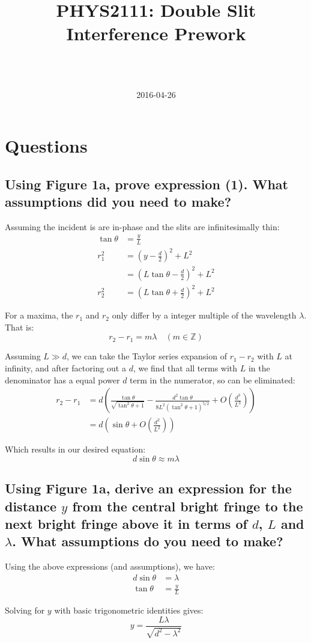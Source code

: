 \documentclass[a4paper]{scrartcl}
\begin{document}
\title{PHYS2111: Double Slit Interference Prework}
\author{ \\ \\ }
\date{2016-04-26}
\maketitle

\section{Questions}
\subsection{Using Figure 1a, prove expression (1). What assumptions did you need to make?}
Assuming the incident is are in-phase and the slits are infinitesimally thin:
\begin{align*}
    \tan \theta &= \frac{y}{L} \\
    r_1^2 &= (y - \frac{d}{2})^2 + L^2 \\
    &= (L \tan \theta - \frac{d}{2})^2 + L^2 \\
    r_2^2 &= (L \tan \theta + \frac{d}{2})^2 + L^2
\end{align*}

For a maxima, the \(r_1\) and \(r_2\) only differ by a integer multiple of the wavelength \(\lambda\). That is:
\[r_2 - r_1 = m \lambda \quad (m \in \mathbb{Z})\]

Assuming \(L \gg d\), we can take the Taylor series expansion of \(r_1 - r_2\) with \(L\) at infinity, and after factoring out a \(d\), we find that all terms with \(L\) in the denominator has a equal power \(d\) term in the numerator, so can be eliminated:
\begin{align*}
    r_2 - r_1 &= d \left(\frac{\tan \theta}{\sqrt{\tan^2 \theta + 1}} - \frac{d^2 \tan \theta}{8 L^2 \left(\tan^2 \theta + 1\right)^{5/2}} + O\left(\frac{d^3}{L^3}\right)\right) \\
    &= d \left(\sin \theta + O\left(\frac{d^2}{L^2}\right)\right)
\end{align*}

Which results in our desired equation:
\[d \sin \theta \approx m \lambda\]

\subsection{Using Figure 1a, derive an expression for the distance \(y\) from the central bright fringe to the next bright fringe above it in terms of \(d\), \(L\) and \(\lambda\). What assumptions do you need to make?}
Using the above expressions (and assumptions), we have:
\begin{align*}
    d \sin \theta &= \lambda \\
    \tan \theta &= \frac{y}{L}
\end{align*}

Solving for \(y\) with basic trigonometric identities gives:
\[y = \frac{L \lambda}{\sqrt{d^2 - \lambda^2}}\]
\end{document}
